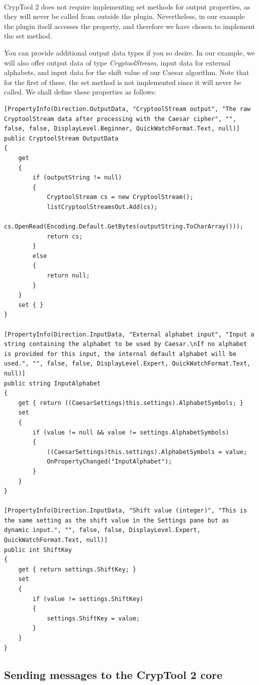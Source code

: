 \ \\
\indent CrypTool 2 does not require implementing set methods for output properties, as they will never be called from outside the plugin. Nevertheless, in our example the plugin itself accesses the property, and therefore we have chosen to implement the set method.

You can provide additional output data types if you so desire. In our example, we will also offer output data of type \textit{CryptoolStream}, input data for external alphabets, and input data for the shift value of our Caesar algorithm. Note that for the first of these, the set method is not implemented since it will never be called. We shall define these properties as follows:

\begin{lstlisting}
[PropertyInfo(Direction.OutputData, "CryptoolStream output", "The raw CryptoolStream data after processing with the Caesar cipher", "", false, false, DisplayLevel.Beginner, QuickWatchFormat.Text, null)]
public CryptoolStream OutputData
{
	get
	{
		if (outputString != null)
		{
			CryptoolStream cs = new CryptoolStream();
			listCryptoolStreamsOut.Add(cs);
			cs.OpenRead(Encoding.Default.GetBytes(outputString.ToCharArray()));
			return cs;
		}
		else
		{
			return null;
		}
	}
	set { }
}

[PropertyInfo(Direction.InputData, "External alphabet input", "Input a string containing the alphabet to be used by Caesar.\nIf no alphabet is provided for this input, the internal default alphabet will be used.", "", false, false, DisplayLevel.Expert, QuickWatchFormat.Text, null)]
public string InputAlphabet
{
	get { return ((CaesarSettings)this.settings).AlphabetSymbols; }
	set
	{
		if (value != null && value != settings.AlphabetSymbols)
		{
			((CaesarSettings)this.settings).AlphabetSymbols = value;
			OnPropertyChanged("InputAlphabet");
		}
	}
}

[PropertyInfo(Direction.InputData, "Shift value (integer)", "This is the same setting as the shift value in the Settings pane but as dynamic input.", "", false, false, DisplayLevel.Expert, QuickWatchFormat.Text, null)]
public int ShiftKey
{
	get { return settings.ShiftKey; }
	set
	{
		if (value != settings.ShiftKey)
		{
			settings.ShiftKey = value;
		}
	}
}
\end{lstlisting}


\subsection{Sending messages to the CrypTool 2 core}
\label{sec:SendingMessagesToTheCrypTool2Core}


